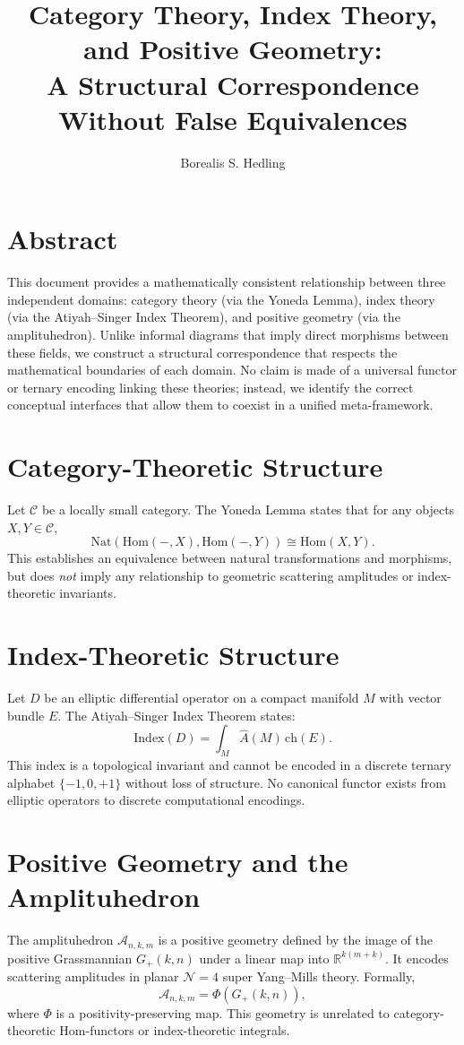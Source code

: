 \documentclass[11pt]{article}
\title{Category Theory, Index Theory, and Positive Geometry:\\
A Structural Correspondence Without False Equivalences}
\author{Borealis S. Hedling}
\date{}
\begin{document}
\maketitle

\section*{Abstract}
This document provides a mathematically consistent relationship between three
independent domains: category theory (via the Yoneda Lemma), index theory (via
the Atiyah--Singer Index Theorem), and positive geometry (via the amplituhedron).
Unlike informal diagrams that imply direct morphisms between these fields, we
construct a structural correspondence that respects the mathematical boundaries
of each domain. No claim is made of a universal functor or ternary encoding
linking these theories; instead, we identify the correct conceptual interfaces
that allow them to coexist in a unified meta-framework.

\section{Category-Theoretic Structure}
Let $\mathcal{C}$ be a locally small category. The Yoneda Lemma states that
for any objects $X,Y \in \mathcal{C}$,
\[
\mathrm{Nat}(\mathrm{Hom}(-,X), \mathrm{Hom}(-,Y))
\cong \mathrm{Hom}(X,Y).
\]
This establishes an equivalence between natural transformations and morphisms,
but does \emph{not} imply any relationship to geometric scattering amplitudes
or index-theoretic invariants.

\section{Index-Theoretic Structure}
Let $D$ be an elliptic differential operator on a compact manifold $M$ with
vector bundle $E$. The Atiyah--Singer Index Theorem states:
\[
\mathrm{Index}(D)
= \int_M \hat{A}(M)\,\mathrm{ch}(E).
\]
This index is a topological invariant and cannot be encoded in a discrete
ternary alphabet $\{-1,0,+1\}$ without loss of structure. No canonical functor
exists from elliptic operators to discrete computational encodings.

\section{Positive Geometry and the Amplituhedron}
The amplituhedron $\mathcal{A}_{n,k,m}$ is a positive geometry defined by the
image of the positive Grassmannian $G_+(k,n)$ under a linear map into
$\mathbb{R}^{k(m+k)}$. It encodes scattering amplitudes in planar $\mathcal{N}=4$
super Yang--Mills theory. Formally,
\[
\mathcal{A}_{n,k,m} = \Phi(G_+(k,n)),
\]
where $\Phi$ is a positivity-preserving map. This geometry is unrelated to
category-theoretic Hom-functors or index-theoretic integrals.
\end{document}
